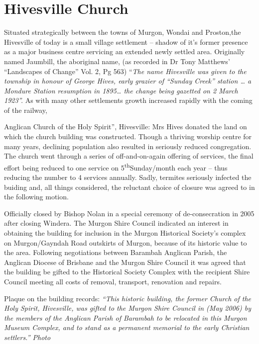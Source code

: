 \section{Hivesville Church}

Situated strategically between the towns of Murgon, Wondai and
Proston,the Hivesville of today is a small village settlement -- shadow
of it's former presence as a major business centre servicing an extended
newly settled area. Originally named Jaumbill, the aboriginal name, (as
recorded in Dr Tony Matthews' ``Landscapes of Change'' Vol. 2, Pg 563)
``\emph{The name Hivesville was given to the township in honour of
George Hives, early grazier of ``Sunday Creek'' station \ldots{} a
Mondure Station resumption in 1895\ldots{} the change being gazetted on
2 March 1923''.} As with many other settlements growth increased rapidly
with the coming of the railway,

Anglican Church of the Holy Spirit'', Hivesville: Mrs Hives donated the
land on which the church building was constructed. Though a thriving
worship centre for many years, declining population also resulted in
seriously reduced congregation. The church went through a series of
off-and-on-again offering of services, the final effort being reduced to
one service on 5\textsuperscript{th}Sunday/month each year -- thus
reducing the number to 4 services annually. Sadly, termites seriously
infected the buiding and, all things considered, the reluctant choice of
closure was agreed to in the following motion.

Officially closed by Bishop Nolan in a special ceremony of
de-consecration in 2005 after closing Windera. The Murgon Shire Council
indicated an interest in obtaining the building for inclusion in the
Murgon Historical Society's complex on Murgon/Gayndah Road outskirts of
Murgon, because of its historic value to the area. Following
negotiations between Barambah Anglican Parish, the Anglican Diocese of
Brisbane and the Murgon Shire Council it was agreed that the building be
gifted to the Historical Society Complex with the recipient Shire
Council meeting all costs of removal, transport, renovation and repairs.

Plaque on the building records: \emph{``This historic building, the
former Church of the Holy Spirit, Hivesville, was gifted to the Murgon
Shire Council in (May 2006) by the members of the Anglican Parish of
Barambah to be relocated in this Murgon Museum Complex, and to stand as
a permanent memorial to the early Christian settlers.'' Photo}

